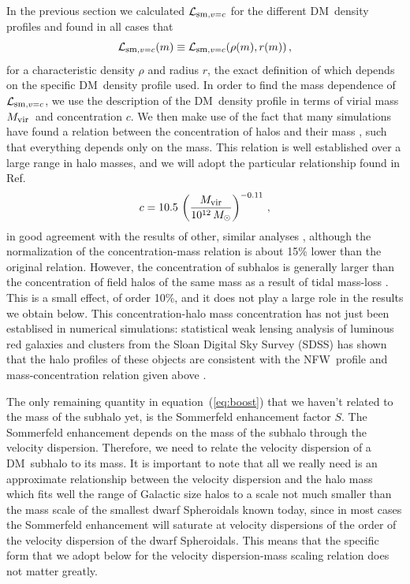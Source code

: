 \documentclass[aps,prd,twocolumn,amsmath,amssymb,floatfix,nofootinbib,10pt]{revtex4}
\newcommand{\NFW}{NFW}
\newcommand{\DM}{DM}
\newcommand{\somm}{\ensuremath{S}}
\newcommand{\eqnname}{equation}
\newcommand{\lum}{\ensuremath{\mathcal{L}}}
\newcommand{\lumsmoothc}{\ensuremath{\lum_{\mbox{{\footnotesize sm}},v=c}}}
\newcommand{\Msol}{\ensuremath{M_{\odot}}}
\newcommand{\Mvir}{\ensuremath{M_{\mbox{{\footnotesize vir}}}}}
\newcommand{\conc}{\ensuremath{c}}
\newcommand{\SDSS}{SDSS}
\begin{document}
In the previous section we calculated $\lumsmoothc$ for the different
\DM\ density profiles and found in all cases that
\begin{equation}
\lumsmoothc(m) \equiv \lumsmoothc(\rho(m),r(m))\, ,
\end{equation}
for a characteristic density $\rho$ and radius $r$, the exact
definition of which depends on the specific \DM\ density profile
used. In order to find the mass dependence of $\lumsmoothc$, we use
the description of the \DM\ density profile in terms of virial mass
\Mvir\ and concentration \conc. We then make use of the fact that many
simulations have found a relation between the concentration of halos
and their mass
\cite{2001MNRAS.321..559B,2001ApJ...554..114E,2008MNRAS.387..536G,2007MNRAS.381.1450N},
such that everything depends only on the mass. This relation is well
established over a large range in halo masses, and we will adopt the
particular relationship found in Ref.~\cite{2007MNRAS.378...55M}
\begin{equation}\label{eq:concscaling}
\conc = 10.5 \, \left(\frac{\Mvir}{10^{12}\, \Msol}\right)^{-0.11}\, ,
\end{equation}
in good agreement with the results of other, similar analyses
\cite{2001MNRAS.321..559B,2005MNRAS.357..387K}, although the
normalization of the concentration-mass relation is about 15\% lower
than the original relation. However, the concentration of subhalos is
generally larger than the concentration of field halos of the same
mass as a result of tidal mass-loss
\cite{1998MNRAS.300..146G,2008ApJ...673..226P,2004MNRAS.355..794H,2005ApJ...635..931B,2004ApJ...608..663K}. This
is a small effect, of order 10\%, and it does not play a large role in
the results we obtain below. This concentration-halo mass
concentration has not just been establised in numerical simulations:
statistical weak lensing analysis of luminous red galaxies and
clusters from the Sloan Digital Sky Survey (\SDSS) has shown that the
halo profiles of these objects are consistent with the \NFW\ profile
and mass-concentration relation given above
\cite{2008JCAP...08..006M}.

The only remaining quantity in \eqnname\ (\ref{eq:boost}) that we
haven't related to the mass of the subhalo yet, is the Sommerfeld
enhancement factor \somm. The Sommerfeld enhancement depends on the
mass of the subhalo through the velocity dispersion. Therefore, we
need to relate the velocity dispersion of a \DM\ subhalo to its
mass. It is important to note that all we really need is an
approximate relationship between the velocity dispersion and the halo
mass which fits well the range of Galactic size halos to a scale not
much smaller than the mass scale of the smallest dwarf Spheroidals
known today, since in most cases the Sommerfeld enhancement will
saturate at velocity dispersions of the order of the velocity
dispersion of the dwarf Spheroidals. This means that the specific form
that we adopt below for the velocity dispersion-mass scaling relation
does not matter greatly.
\end{document}
